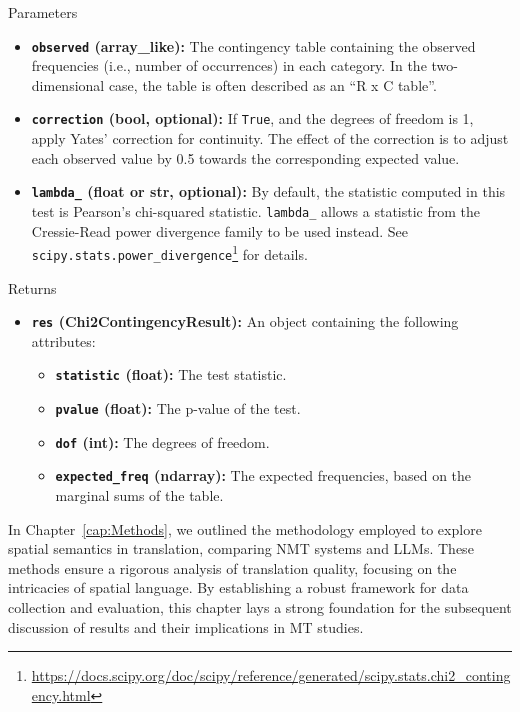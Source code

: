 \begin{description}
    \item[Parameters] 
\end{description}
  
    \begin{itemize}
        \item \textbf{\texttt{observed} (array\_like):} The contingency table containing the observed frequencies (i.e., number of occurrences) in each category. In the two-dimensional case, the table is often described as an “R x C table”.
        \item \textbf{\texttt{correction} (bool, optional):} If \texttt{True}, and the degrees of freedom is 1, apply Yates’ correction for continuity. The effect of the correction is to adjust each observed value by 0.5 towards the corresponding expected value.
        \item \textbf{\texttt{lambda\_} (float or str, optional):} By default, the statistic computed in this test is Pearson’s chi-squared statistic. \texttt{lambda\_} allows a statistic from the Cressie-Read power divergence family to be used instead. See \texttt{scipy.stats.power\_divergence}\footnote{\href{https://docs.scipy.org/doc/scipy/reference/generated/scipy.stats.power\_divergence.html}{https://docs.scipy.org/doc/scipy/reference/generated/scipy.stats.chi2\_contingency.html}} for details. 
    \end{itemize}
    
\begin{description}
    \item[Returns] 
\end{description}  

    \begin{itemize}
        \item \textbf{\texttt{res} (Chi2ContingencyResult):} An object containing the following attributes:
        \begin{itemize}
            \item \textbf{\texttt{statistic} (float):} The test statistic.
            \item \textbf{\texttt{pvalue} (float):} The p-value of the test.
            \item \textbf{\texttt{dof} (int):} The degrees of freedom.
            \item \textbf{\texttt{expected\_freq} (ndarray):} The expected frequencies, based on the marginal sums of the table.
        \end{itemize}       
    \end{itemize}

\vspace{0.5em} %

In Chapter~\ref{cap:Methods}, we outlined the methodology employed to explore spatial semantics in translation, comparing NMT systems and LLMs. These methods ensure a rigorous analysis of translation quality, focusing on the intricacies of spatial language. By establishing a robust framework for data collection and evaluation, this chapter lays a strong foundation for the subsequent discussion of results and their implications in MT studies.


